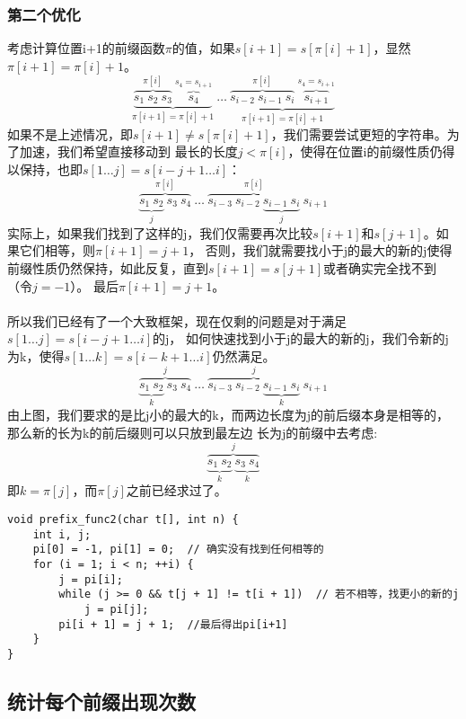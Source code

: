         \subsubsection{第二个优化}
            考虑计算位置i+1的前缀函数$\pi$的值，如果$s[i+1]=s[\pi[i]+1]$，显然$\pi[i+1]=\pi[i]+1$。
            $$ \underbrace{\overbrace{s_1 ~ s_2 ~ s_3}^{\pi[i]} ~ \overbrace{s_4}^{s_4 = s_{i+1}}}_{\pi[i+1] = \pi[i] + 1} ~ \dots ~ 
            \underbrace{\overbrace{s_{i-2} ~ s_{i-1} ~ s_{i}}^{\pi[i]} ~ \overbrace{s_{i+1}}^{s_4 = s_{i+1}}}_{\pi[i+1] = \pi[i] + 1} $$
            如果不是上述情况，即$s[i+1] \neq s[\pi[i]+1]$，我们需要尝试更短的字符串。为了加速，我们希望直接移动到
            最长的长度$j<\pi[i]$，使得在位置i的前缀性质仍得以保持，也即$s[1 \dots j] = s[i-j+1 \dots i]$：
            $$\overbrace{\underbrace{s_1 ~ s_2}_j ~ s_3 ~ s_4}^{\pi[i]} ~ \dots ~ \overbrace{s_{i-3} ~ s_{i-2} ~ \underbrace{s_{i-1} ~ s_{i}}_j}^{\pi[i]} ~ s_{i+1}$$
            实际上，如果我们找到了这样的j，我们仅需要再次比较$s[i+1]$和$s[j+1]$。如果它们相等，则$\pi[i+1]=j+1$，
            否则，我们就需要找小于j的最大的新的j使得前缀性质仍然保持，如此反复，直到$s[i+1]=s[j+1]$或者确实完全找不到（令$j=-1$）。
            最后$\pi[i+1]=j+1$。\\\\
            所以我们已经有了一个大致框架，现在仅剩的问题是对于满足$s[1 \dots j] = s[i-j+1 \dots i]$的j，
            如何快速找到小于j的最大的新的j，我们令新的j为k，使得$s[1 \dots k] = s[i-k+1 \dots i]$仍然满足。
            $$\overbrace{\underbrace{s_1 ~ s_2}_k ~ s_3 ~ s_4}^j ~ \dots ~ \overbrace{s_{i-3} ~ s_{i-2} ~ \underbrace{s_{i-1} ~ s_{i}}_k}^j ~s_{i+1}$$
            由上图，我们要求的是比j小的最大的k，而两边长度为j的前后缀本身是相等的，那么新的长为k的前后缀则可以只放到最左边
            长为j的前缀中去考虑:
            $$\overbrace{\underbrace{s_1 ~ s_2}_k ~ \underbrace{s_3 ~ s_4}_k}^j$$
            即$k=\pi[j]$，而$\pi[j]$之前已经求过了。
            \begin{lstlisting}
void prefix_func2(char t[], int n) {
    int i, j;
    pi[0] = -1, pi[1] = 0;  // 确实没有找到任何相等的
    for (i = 1; i < n; ++i) {
        j = pi[i];
        while (j >= 0 && t[j + 1] != t[i + 1])  // 若不相等，找更小的新的j
            j = pi[j];
        pi[i + 1] = j + 1;  //最后得出pi[i+1]
    }
}
            \end{lstlisting}
    
    \subsection{统计每个前缀出现次数}

